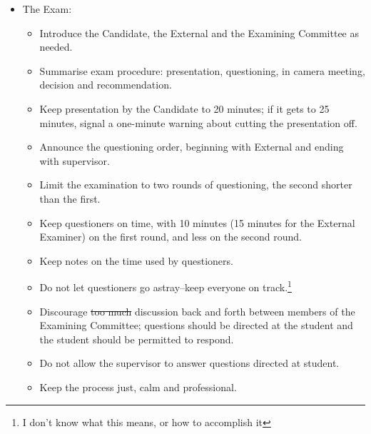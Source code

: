 \documentclass[12pt]{article}
\newcommand{\discuss}[1]{\footnote{\color{fixmeColor}#1\color{black}}\index{$>>>>$DISCUSS$<<<<$}}
\newcommand{\supervisor}{supervisor\xspace}
\begin{document}
\begin{itemize}

    \item The Exam:

        \begin{itemize}

            \item Introduce the Candidate, the External and the Examining
                Committee as needed.

            \item Summarise exam procedure: presentation, questioning, in
                camera meeting, decision and recommendation.

            \item Keep presentation by the Candidate to 20 minutes; if it gets
                to 25 minutes, signal a one-minute warning about cutting
                the presentation off.

            \item Announce the questioning order, beginning with External and
                ending with \supervisor.

            \item Limit the examination to two rounds of questioning, the
                second shorter than the first.

            \item Keep questioners on time, with 10 minutes (15 minutes for the
                External Examiner) on the first round, and less on the second
                round.

            \item Keep notes on the time used by questioners.

            \item Do not let questioners go astray--keep everyone on
                track.\discuss{I don't know what this means, or how to
                accomplish it}

            \item Discourage \sout{too much} discussion back and forth between members
                of the Examining Committee; questions should be directed at the
                student and the student should be permitted to respond.

            \item Do not allow the \supervisor to answer questions directed at student.

            \item Keep the process just, calm and professional.


\end{itemize}
\end{itemize}
\end{document}
